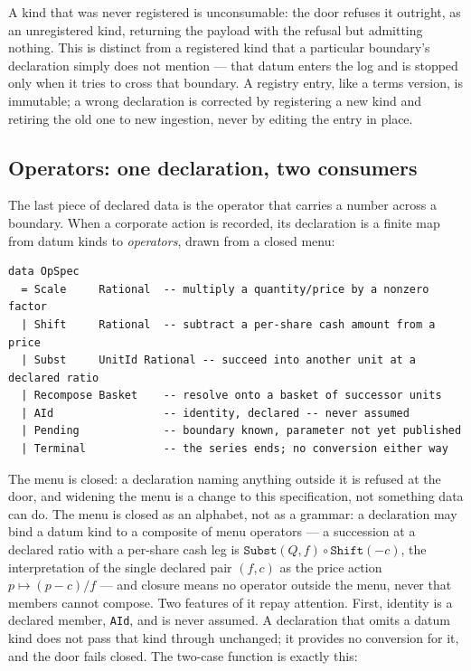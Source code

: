 A kind that was never registered is unconsumable: the door refuses it outright, as
an unregistered kind, returning the payload with the refusal but admitting nothing. This is distinct
from a registered kind that a particular boundary's declaration simply does not
mention --- that datum enters the log and is stopped only when it tries to cross
that boundary. A registry entry, like a terms version, is immutable; a wrong
declaration is corrected by registering a new kind and retiring the old one to new
ingestion, never by editing the entry in place.

\subsection{Operators: one declaration, two consumers}

The last piece of declared data is the operator that carries a number across a
boundary. When a corporate action is recorded, its declaration is a finite map
from datum kinds to \emph{operators}, drawn from a closed menu:

\begin{lstlisting}
data OpSpec
  = Scale     Rational  -- multiply a quantity/price by a nonzero factor
  | Shift     Rational  -- subtract a per-share cash amount from a price
  | Subst     UnitId Rational -- succeed into another unit at a declared ratio
  | Recompose Basket    -- resolve onto a basket of successor units
  | AId                 -- identity, declared -- never assumed
  | Pending             -- boundary known, parameter not yet published
  | Terminal            -- the series ends; no conversion either way
\end{lstlisting}

The menu is closed: a declaration naming anything outside it is refused at the
door, and widening the menu is a change to this specification, not something data
can do. The menu is closed as an alphabet, not as a grammar: a declaration may
bind a datum kind to a composite of menu operators --- a succession at a declared
ratio with a per-share cash leg is $\texttt{Subst}(Q, f) \circ \texttt{Shift}(-c)$,
the interpretation of the single declared pair $(f, c)$ as the price action
$p \mapsto (p - c)/f$ --- and closure means no operator outside the menu, never that
members cannot compose. Two features of it repay attention. First, identity is a declared member,
\texttt{AId}, and is never assumed. A declaration that omits a datum kind does not
pass that kind through unchanged; it provides no conversion for it, and the door
fails closed. The two-case function is exactly this:

